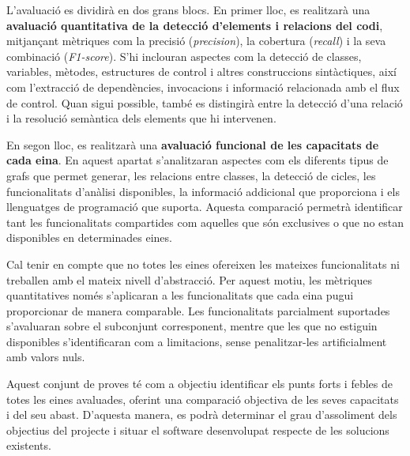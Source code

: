 L'avaluació es dividirà en dos grans blocs. En primer lloc, es realitzarà una \textbf{avaluació quantitativa de la detecció d'elements i relacions del codi}, mitjançant mètriques com la precisió (\textit{precision}), la cobertura (\textit{recall}) i la seva combinació (\textit{F1-score}). S'hi inclouran aspectes com la detecció de classes, variables, mètodes, estructures de control i altres construccions sintàctiques, així com l'extracció de dependències, invocacions i informació relacionada amb el flux de control. Quan sigui possible, també es distingirà entre la detecció d'una relació i la resolució semàntica dels elements que hi intervenen.

En segon lloc, es realitzarà una \textbf{avaluació funcional de les capacitats de cada eina}. En aquest apartat s'analitzaran aspectes com els diferents tipus de grafs que permet generar, les relacions entre classes, la detecció de cicles, les funcionalitats d'anàlisi disponibles, la informació addicional que proporciona i els llenguatges de programació que suporta. Aquesta comparació permetrà identificar tant les funcionalitats compartides com aquelles que són exclusives o que no estan disponibles en determinades eines.

Cal tenir en compte que no totes les eines ofereixen les mateixes funcionalitats ni treballen amb el mateix nivell d'abstracció. Per aquest motiu, les mètriques quantitatives només s'aplicaran a les funcionalitats que cada eina pugui proporcionar de manera comparable. Les funcionalitats parcialment suportades s'avaluaran sobre el subconjunt corresponent, mentre que les que no estiguin disponibles s'identificaran com a limitacions, sense penalitzar-les artificialment amb valors nuls.

Aquest conjunt de proves té com a objectiu identificar els punts forts i febles de totes les eines avaluades, oferint una comparació objectiva de les seves capacitats i del seu abast. D'aquesta manera, es podrà determinar el grau d'assoliment dels objectius del projecte i situar el software desenvolupat respecte de les solucions existents.
